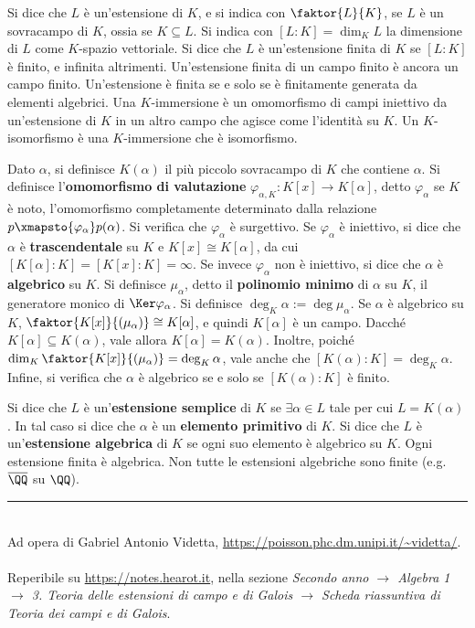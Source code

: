 \documentclass[10pt,landscape]{article}
\begin{document}
\begin{multicols}{3}
		
		Si dice che $L$ è un'estensione di $K$, e si indica
		con $\faktor{L}{K}$, se $L$ è un sovracampo di $K$,
		ossia se $K \subseteq L$. Si indica con $[L : K] = \dim_K L$ la
		dimensione di $L$ come $K$-spazio vettoriale. Si
		dice che $L$ è un'estensione finita di $K$ se $[L : K]$
		è finito, e infinita altrimenti. Un'estensione finita
		di un campo finito è ancora un campo finito. Un'estensione
		è finita se e solo se è finitamente generata da elementi algebrici. Una $K$-immersione è un omomorfismo di campi
		iniettivo da un'estensione di $K$ in un altro campo che
		agisce come l'identità su $K$. Un $K$-isomorfismo è
		una $K$-immersione che è isomorfismo. \medskip
		
		
		Dato $\alpha$, si definisce $K(\alpha)$ il più piccolo
		sovracampo di $K$ che contiene $\alpha$. Si definisce l'\textbf{omomorfismo di
		valutazione} $\varphi_{\alpha, K} : K[x] \to K[\alpha]$, detto
		$\varphi_\alpha$ se $K$ è noto, l'omomorfismo completamente
		determinato dalla relazione $p \xmapsto{\varphi_\alpha} p(\alpha)$. Si verifica che $\varphi_\alpha$ è
		surgettivo. Se $\varphi_\alpha$ è iniettivo,
		si dice che $\alpha$ è \textbf{trascendentale} su $K$ e
		$K[x] \cong K[\alpha]$, da cui $[K[\alpha] : K] =
		[K[x] : K] = \infty$. Se invece $\varphi_\alpha$ non
		è iniettivo, si dice che $\alpha$ è \textbf{algebrico}
		su $K$. Si definisce $\mu_\alpha$, detto il \textbf{polinomio
		minimo} di $\alpha$ su $K$, il generatore monico
		di $\Ker \varphi_\alpha$. Si definisce
		$\deg_K \alpha := \deg \mu_\alpha$. Se $\alpha$ è
		algebrico su $K$, $\faktor{K[x]}{(\mu_\alpha)} \cong
		K[\alpha]$, e quindi $K[\alpha]$ è un campo. Dacché
		$K[\alpha] \subseteq K(\alpha)$, vale allora
		$K[\alpha] = K(\alpha)$. Inoltre, poiché $\dim_K \faktor{K[x]}{(\mu_\alpha)} = \deg_K \alpha$, vale
		anche che $[K(\alpha) : K] = \deg_K \alpha$.
		Infine, si verifica che $\alpha$ è algebrico se e solo se
		$[K(\alpha) : K]$ è finito. \medskip

		
		Si dice che $L$ è un'\textbf{estensione semplice} di
		$K$ se $\exists \alpha \in L$ tale per cui $L = K(\alpha)$.
		In tal caso si dice che $\alpha$ è un \textbf{elemento primitivo} di $K$. Si dice che $L$ è un'\textbf{estensione
		algebrica} di $K$ se ogni suo elemento è algebrico su $K$.
		Ogni estensione finita è algebrica. Non tutte le
		estensioni algebriche sono finite (e.g.~
		$\overline{\QQ}$ su $\QQ$).
		\vfill
		\hrule
		~\\
		Ad opera di Gabriel Antonio Videtta, \url{https://poisson.phc.dm.unipi.it/~videtta/}.
		~\\Reperibile su
		\url{https://notes.hearot.it}, nella sezione \textit{Secondo anno $\to$ Algebra 1 $\to$ 3. Teoria delle estensioni di campo e di Galois $\to$ Scheda riassuntiva di Teoria dei campi e di Galois}.
	\end{multicols}
	
\end{document}
